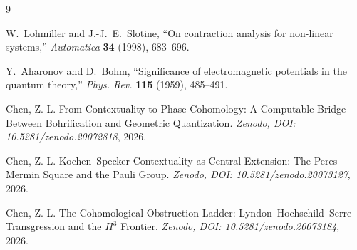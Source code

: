 \documentclass[11pt]{article}
\begin{document}
\begin{thebibliography}{9}

W.~Lohmiller and J.-J.~E.~Slotine,
``On contraction analysis for non-linear systems,''
\textit{Automatica} \textbf{34} (1998), 683--696.

Y.~Aharonov and D.~Bohm,
``Significance of electromagnetic potentials in the quantum theory,''
\textit{Phys. Rev.} \textbf{115} (1959), 485--491.

Chen, Z.-L.
From Contextuality to Phase Cohomology:
A Computable Bridge Between Bohrification and Geometric Quantization.
\textit{Zenodo, DOI: 10.5281/zenodo.20072818}, 2026.

Chen, Z.-L.
Kochen--Specker Contextuality as Central Extension: 
The Peres--Mermin Square and the Pauli Group.
\textit{Zenodo, DOI: 10.5281/zenodo.20073127}, 2026.

Chen, Z.-L.
The Cohomological Obstruction Ladder: 
Lyndon--Hochschild--Serre Transgression and the $H^3$ Frontier.
\textit{Zenodo, DOI: 10.5281/zenodo.20073184}, 2026.

\end{thebibliography}
\end{document}

